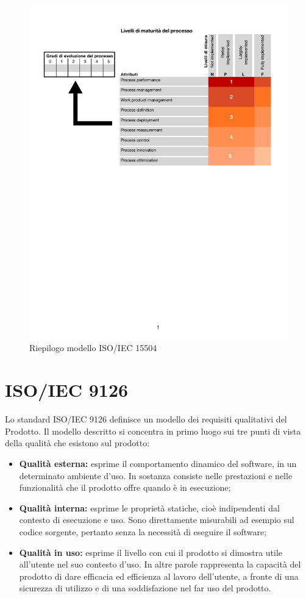 	\begin{figure}[htbp]
	\centering
	\includegraphics[scale=0.7]{images/ISOIEC15504.pdf}
	\caption{Riepilogo modello ISO/IEC 15504}
	\end{figure}
	\newpage
\section{ISO/IEC 9126}
Lo standard ISO/IEC 9126 definisce un modello dei requisiti qualitativi del Prodotto.
	  Il modello descritto si concentra in primo luogo sui tre punti di vista della qualità che esistono sul prodotto:
	  \begin{itemize}
	  \item \textbf{Qualità esterna:} esprime il comportamento dinamico del software, in un determinato ambiente d'uso. In sostanza consiste nelle prestazioni e nelle funzionalità che il prodotto offre quando è in esecuzione;
	  \item \textbf{Qualità interna:} esprime le proprietà statiche, cioè
indipendenti dal contesto di esecuzione e uso. Sono direttamente misurabili ad esempio sul
codice sorgente, pertanto senza la necessità di eseguire il software;
	  \item \textbf{Qualità in uso:} esprime il livello con cui il prodotto si dimostra utile all'utente nel suo contesto d'uso. In altre parole rappresenta la capacità del prodotto di dare efficacia ed efficienza al lavoro dell'utente, a fronte di una sicurezza di utilizzo e di una soddisfazione nel far uso del prodotto.
	  \end{itemize}
